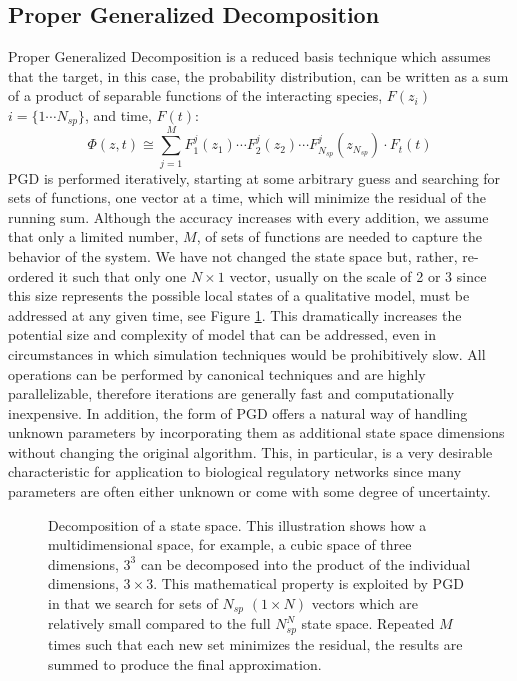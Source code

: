 \documentclass[en]{jdoc}
\begin{document}
\subsection{Proper Generalized Decomposition}
Proper Generalized Decomposition \cite{chinesta2011overview,chinesta2010use} is a reduced basis technique which assumes that the target, in this case, the probability distribution, can be written as a sum of a product of separable functions of the interacting species, $F(z_i)$ $i=\{1\cdots N_{sp}\}$, and time, $F(t)$:
\[
 \Phi(z,t)\cong \sum_{j=1}^{M}F_1^j(z_1)\cdots F_2^j(z_2)\cdots F_{N_{sp}}^j(z_{N_{sp}}) \cdot F_t(t)
\]
PGD is performed iteratively, starting at some arbitrary guess and searching for sets of functions, one vector at a time, which will minimize the residual of the running sum. Although the accuracy increases with every addition, we assume that only a limited number, $M$, of sets of functions are needed to capture the behavior of the system. We have not changed the state space but, rather, re-ordered it such that only one $N\times1$ vector, usually on the scale of 2 or 3 since this size represents the possible local states of a qualitative model, must be addressed at any given time, see Figure \ref{cubes}. This dramatically increases the potential size and complexity of model that can be addressed, even in circumstances in which simulation techniques would be prohibitively slow. All operations can be performed by canonical techniques and are highly parallelizable, therefore iterations are generally fast and computationally inexpensive. In addition, the form of PGD offers a natural way of handling unknown parameters by incorporating them as additional state space dimensions without changing the original algorithm. This, in particular, is a very desirable characteristic for application to biological regulatory networks since many parameters are often either unknown or come with some degree of uncertainty.
\begin{figure}[h]
\centering
{}
\caption{Decomposition of a state space. This illustration shows how a multidimensional space, for example, a cubic space of three dimensions, $3^3$ can be decomposed into the product of the individual dimensions, $3\times 3$. This mathematical property is exploited by PGD in that we search for sets of $N_{sp}$ $(1\times N)$ vectors  which are relatively small compared to the full $N_{sp}^N$ state space. Repeated $M$ times such that each new set minimizes the residual, the results are summed to produce the final approximation.}
\label{cubes}
\end{figure}
\end{document}
